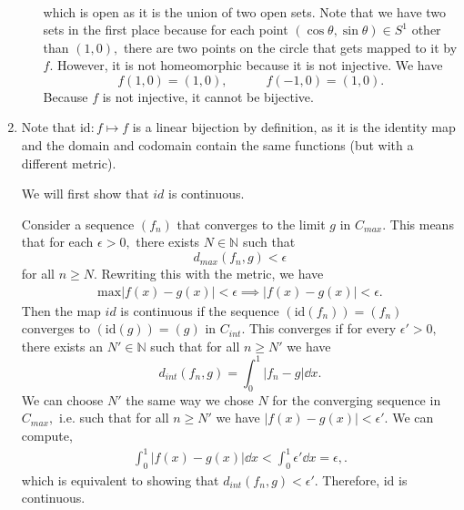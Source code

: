 \documentclass{article}
\numberwithin{equation}{section}
\begin{document}
\begin{enumerate}
\begin{enumerate}[label=(\alph*)]
\begin{align*}
         \end{align*}
         which is open as it is the union of two open sets. Note that we have two sets in the first place because for each point $(\cos\theta,\sin\theta) \in S^1$ other than $(1,0),$ there are two points on the circle that gets mapped to it by $f.$ However, it is not homeomorphic because it is not injective. We have 
         \begin{equation*}
            f(1,0) = (1,0),\quad\quad\quad f(-1,0) = (1,0).
         \end{equation*} 
         Because $f$ is not injective, it cannot be bijective.
    \end{enumerate}
    \newpage
    \item Note that $\text{id}:f\mapsto f$ is a linear bijection by definition, as it is the identity map and the domain and codomain contain the same functions (but with a different metric).
    
    We will first show that $id$ is continuous.


    Consider a sequence $(f_n)$ that converges to the limit $g$ in $C_{max}.$ This means that for each $\epsilon > 0,$ there exists $N\in \mathbb{N}$ such that 
    \begin{equation*}
        d_{max}(f_n,g)<\epsilon
    \end{equation*}  
    for all $n \ge N.$ Rewriting this with the metric, we have 
    \begin{align*}
        \text{max}|f(x)-g(x)| < \epsilon \implies |f(x)-g(x)|<\epsilon.
    \end{align*}
    Then the map $id$ is continuous if the sequence $(\text{id}(f_n))=(f_n)$ converges to $(\text{id}(g))=(g)$ in $C_{int}.$ This converges if for every $\epsilon' > 0,$ there exists an $N' \in \mathbb{N}$ such that for all $n\ge N'$ we have 
    \begin{equation*}
        d_{int}(f_n,g) = \int_0^1 |f_n-g| \dd{x}.
    \end{equation*}
    We can choose $N'$ the same way we chose $N$ for the converging sequence in $C_{max},$ i.e. such that for all $n\ge N'$ we have $|f(x)-g(x)|<\epsilon'.$ We can compute,
    \begin{align*}
        \int_0^1 |f(x)-g(x)| \dd{x} < \int_0^1 \epsilon' \dd{x} = \epsilon,.
    \end{align*}
    which is equivalent to showing that $d_{int}(f_n,g)<\epsilon'.$ Therefore, $\text{id}$ is continuous.


\end{enumerate}
\end{document}
